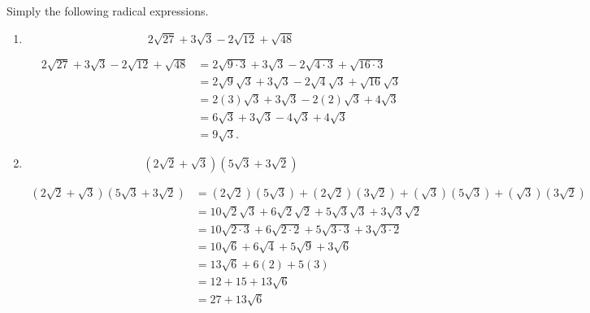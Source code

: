 \documentclass[12pt]{article} %
\begin{document}
\newpage
\begin{qstn}
  Simply the following radical expressions.
  \begin{enumerate}[label=(\alph*)]
    \item \[
        2\sqrt{27} + 3\sqrt{3} - 2\sqrt{12} + \sqrt{48}  
    \] 
    \begin{solution}
      \begin{align*}
        2\sqrt{27} + 3\sqrt{3} - 2\sqrt{12} + \sqrt{48} 
        &= 2\sqrt{9 \cdot 3}  + 3\sqrt{3} - 2\sqrt{4 \cdot 3} + \sqrt{16 \cdot 3}\\
        &= 2\sqrt{9}\sqrt{3} + 3\sqrt{3} - 2\sqrt{4}\sqrt{3} + \sqrt{16}\sqrt{3}\\
        &= 2(3)\sqrt{3} + 3\sqrt{3} - 2(2)\sqrt{3}  + 4\sqrt{3}\\
        &= 6\sqrt{3} + 3\sqrt{3} - 4\sqrt{3} + 4\sqrt{3}\\
        &= 9\sqrt{3} 
      .\end{align*}
      
    \end{solution}


  \item \[
      \left( 2\sqrt{2} + \sqrt{3} \right) \left( 5\sqrt{3}  + 3\sqrt{2}\right)
  \] 
  \begin{solution}
    \begin{align*}
      \left( 2\sqrt{2} + \sqrt{3} \right) \left( 5\sqrt{3}  + 3\sqrt{2}\right)
      &= \left( 2\sqrt{2}\right) \left( 5\sqrt{3}\right) + \left( 2\sqrt{2}\right) \left( 3\sqrt{2}\right) 
              + \left( \sqrt{3}\right) \left( 5\sqrt{3}\right) + \left( \sqrt{3}\right)\left( 3\sqrt{2}\right)\\
      &= 10\sqrt{2}\sqrt{3} + 6\sqrt{2}\sqrt{2} + 5\sqrt{3}\sqrt{3} + 3\sqrt{3}\sqrt{2}\\
      &= 10\sqrt{2\cdot 3} + 6\sqrt{2\cdot 2} + 5\sqrt{3\cdot 3} + 3\sqrt{3\cdot 2}\\
      &= 10\sqrt{6}  + 6\sqrt{4} + 5\sqrt{9} + 3\sqrt{6}\\
      &= 13\sqrt{6} + 6(2) + 5(3)\\
      &= 12 + 15 + 13\sqrt{6} \\
      &= 27 + 13\sqrt{6} 
    \end{align*}
  \end{solution}
  \end{enumerate}
\end{qstn}

\newpage
\end{document}
